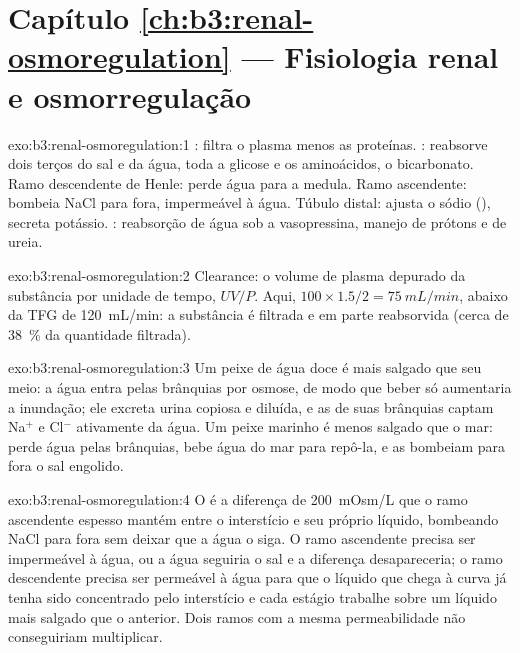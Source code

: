 \section*{Capítulo \ref{ch:b3:renal-osmoregulation} --- Fisiologia renal e osmorregulação}

\begin{solution}{exo:b3:renal-osmoregulation:1}
: filtra o plasma menos as proteínas. :
reabsorve dois terços do sal e da água, toda a glicose e os aminoácidos,
o bicarbonato. Ramo descendente de Henle: perde água para a medula. Ramo
ascendente: bombeia NaCl para fora, impermeável à água. Túbulo distal:
ajusta o sódio (), secreta potássio. : reabsorção
de água sob a vasopressina, manejo de prótons e de ureia.
\end{solution}

\begin{solution}{exo:b3:renal-osmoregulation:2}
Clearance: o volume de plasma depurado da substância por unidade de
tempo, $UV/P$. Aqui, $100\times 1.5/2 = \qty{75}{mL/min}$, abaixo da TFG
de \qty{120}{mL/min}: a substância é filtrada e em parte reabsorvida
(cerca de \qty{38}{\%} da quantidade filtrada).
\end{solution}

\begin{solution}{exo:b3:renal-osmoregulation:3}
Um peixe de água doce é mais salgado que seu meio: a água entra pelas
brânquias por osmose, de modo que beber só aumentaria a inundação; ele
excreta urina copiosa e diluída, e as  de suas
brânquias captam Na$^{+}$ e Cl$^{-}$ ativamente da água. Um peixe marinho
é menos salgado que o mar: perde água pelas brânquias, bebe água do mar
para repô-la, e as  bombeiam para fora o sal engolido.
\end{solution}

\begin{solution}{exo:b3:renal-osmoregulation:4}
O  é a diferença de \qty{200}{mOsm/L} que o ramo ascendente
espesso mantém entre o interstício e seu próprio líquido, bombeando NaCl
para fora sem deixar que a água o siga. O ramo ascendente precisa ser
impermeável à água, ou a água seguiria o sal e a diferença
desapareceria; o ramo descendente precisa ser permeável à água para que
o líquido que chega à curva já tenha sido concentrado pelo interstício e
cada estágio trabalhe sobre um líquido mais salgado que o anterior. Dois
ramos com a mesma permeabilidade não conseguiriam multiplicar.
\end{solution}

